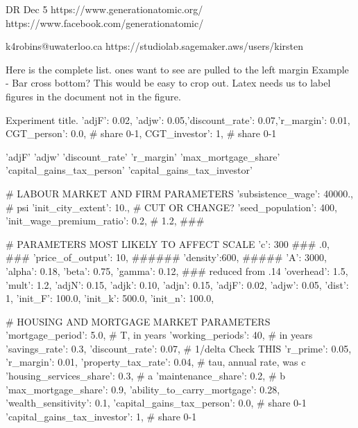 DR Dec 5
https://www.generationatomic.org/
https://www.facebook.com/generationatomic/

k4robins@uwaterloo.ca
https://studiolab.sagemaker.aws/users/kirsten

Here is the complete list. ones want to see are pulled to the left margin
Example - Bar cross bottom?  This would be easy to crop out. Latex needs us to label figures in the document not in the figure.

Experiment title. 'adjF': 0.02, 'adjw': 0.05,'discount_rate': 0.07,'r_margin': 0.01, CGT_person':   0.0, # share 0-1,  CGT_investor': 1, # share 0-1

'adjF'
'adjw'
'discount_rate'
'r_margin'
'max_mortgage_share'
'capital_gains_tax_person'
'capital_gains_tax_investor'


        # LABOUR MARKET AND FIRM PARAMETERS
            'subsistence_wage': 40000., # psi
            'init_city_extent': 10.,    # CUT OR CHANGE?
            'seed_population': 400,
            'init_wage_premium_ratio': 0.2, # 1.2, ###

            # PARAMETERS MOST LIKELY TO AFFECT SCALE
            'c': 300                             ### .0,                            ###
            'price_of_output': 10,                 ######
            'density':600,                         #####
            'A': 3000,
            'alpha': 0.18,
            'beta':  0.75,
            'gamma': 0.12, ### reduced from .14
            'overhead': 1.5,
            'mult': 1.2,
            'adjN': 0.15,
            'adjk': 0.10,
            'adjn': 0.15,
'adjF': 0.02,
'adjw': 0.05, 
            'dist': 1, 
            'init_F': 100.0,
            'init_k': 500.0,
            'init_n': 100.0,

            # HOUSING AND MORTGAGE MARKET PARAMETERS
            'mortgage_period': 5.0,       # T, in years
            'working_periods': 40,        # in years
            'savings_rate': 0.3,
'discount_rate': 0.07,        # 1/delta    Check THIS
            'r_prime': 0.05,
'r_margin': 0.01,
            'property_tax_rate': 0.04,     # tau, annual rate, was c
            'housing_services_share': 0.3, # a
            'maintenance_share': 0.2,      # b
'max_mortgage_share': 0.9,
            'ability_to_carry_mortgage': 0.28,
            'wealth_sensitivity': 0.1,
'capital_gains_tax_person':   0.0, # share 0-1
'capital_gains_tax_investor': 1, # share 0-1
 

